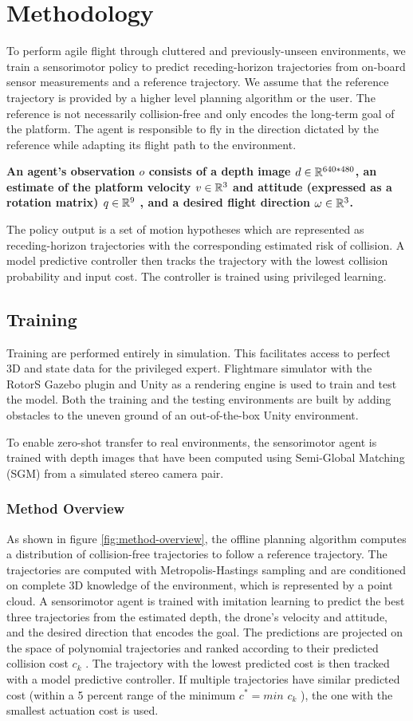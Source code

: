 \chapter{Methodology}
To perform agile flight through cluttered and previously-unseen environments, we train a sensorimotor policy to predict receding-horizon
trajectories from on-board sensor measurements and a reference trajectory. We assume that the reference trajectory is provided by a higher level planning algorithm or the user. The reference is not necessarily
collision-free and only encodes the long-term goal of the platform. The
agent is responsible to fly in the direction dictated by the reference
while adapting its flight path to the environment.

\textbf{An agent’s observation $o$ consists of a depth image $d \in \mathbb{R}^{640*480}$,
an estimate of the platform velocity $v \in \mathbb{R}^3$ and attitude (expressed as
a rotation matrix) $q \in \mathbb{R}^9$ , and a desired flight direction $\omega \in \mathbb{R}^3$. }

The
policy output is a set of motion hypotheses which are represented as
receding-horizon trajectories with the corresponding estimated risk of
collision. A model predictive controller then tracks the trajectory with
 the lowest collision probability and input cost. The controller is trained
using privileged learning.


\section{Training}
Training are performed entirely in simulation. This facilitates access to perfect 3D and state data for the
privileged expert. Flightmare simulator with the RotorS Gazebo plugin and Unity as a rendering engine is used to train and test the model. Both the training
and the testing environments are built by adding obstacles to the uneven
ground of an out-of-the-box Unity environment.

To enable zero-shot transfer to real environments, the sensorimotor agent is trained with depth images that have been
computed using Semi-Global Matching (SGM) from a simulated
stereo camera pair. 
\subsection{Method Overview}
As shown in figure \ref{fig:method-overview}, the offline planning algorithm computes a distribution of collision-free trajectories to follow a reference trajectory. The trajectories are computed with Metropolis-Hastings sampling and are conditioned on complete 3D knowledge of the environment, which is represented by a point cloud. A sensorimotor agent is trained with imitation learning to predict the best three trajectories from the estimated depth, the drone’s velocity and attitude, and the desired direction that encodes the goal. The predictions are projected on the
space of polynomial trajectories and ranked according to their predicted collision cost $c_k$ . The trajectory with the lowest predicted cost is then
tracked with a model predictive controller. If multiple trajectories have similar predicted cost (within a 5 percent range of the minimum $c^* = min$ $c_k$ ),
the one with the smallest actuation cost is used.

